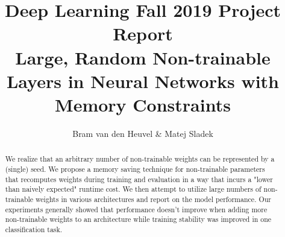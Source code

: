 \documentclass[]{article}
\title{Deep Learning Fall 2019 Project Report\\\large{Large, Random Non-trainable Layers in Neural Networks with Memory Constraints}}
\author{Bram van den Heuvel \& Matej Sladek}
\begin{document}
\maketitle

\begin{abstract}
	We realize that an arbitrary number of non-trainable weights can be represented by a (single) seed. We propose a memory saving technique for non-trainable parameters that recomputes weights during training and evaluation in a way that incurs a "lower than naively expected" runtime cost. We then attempt to utilize large numbers of non-trainable weights in various architectures and report on the model performance. Our experiments generally showed that performance doesn't improve when adding more non-trainable weights to an architecture while training stability was improved in one classification task.
\end{abstract}
\end{document}
